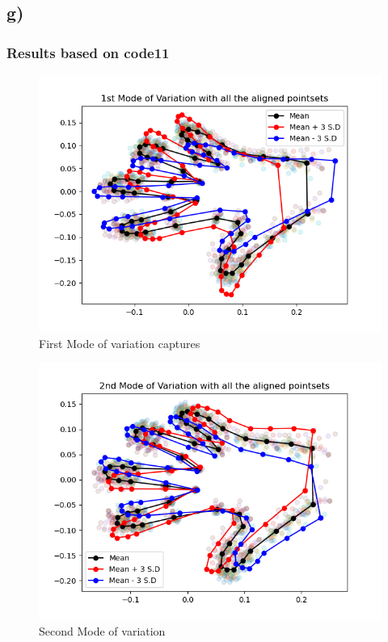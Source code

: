 \documentclass{article}
\begin{document}
\newpage
\thispagestyle{fancy}

\subsection{g)}
\subsubsection{Results based on code11}
\begin{figure}[H]
    \centerline{\includegraphics[scale=0.45]{../results/hand/mean-and-first-mode.png}}
    \caption{First Mode of variation captures}
\end{figure}

\begin{figure}[H]
    \centerline{\includegraphics[scale=0.45]{../results/hand/mean-and-second-mode.png}}
    \caption{Second Mode of variation}
\end{figure}
\end{document}
